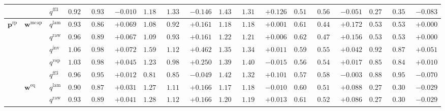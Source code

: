 \documentclass[eng]{kjas3}
\begin{document}
\begin{table}[t]
{\begin{tabular}{lll ccc ccc ccc ccc ccc}
 &  & $q^{\mathrm{ff3}}$ & $0.925$ & $0.935$ & \cellcolor{negred!50}$-0.010$ & $1.184$ & $1.330$ & \cellcolor{negred!50}$-0.146$ & $1.438$ & $1.312$ & \cellcolor{posgreen!50}$+0.126$ & $0.511$ & $0.562$ & \cellcolor{negred!50}$-0.051$ & $0.271$ & $0.354$ & \cellcolor{negred!50}$-0.083$ \\
\midrule
$\mathbf{p}^{\mathrm{rp}}$ & $\mathbf{w}^{\mathrm{mcap}}$ & $q^{\mathrm{lam}}$ & $0.935$ & $0.865$ & \cellcolor{posgreen!50}$+0.069$ & $1.088$ & $0.926$ & \cellcolor{posgreen!50}$+0.161$ & $1.186$ & $1.185$ & \cellcolor{posgreen!50}$+0.001$ & $0.619$ & $0.447$ & \cellcolor{posgreen!50}$+0.172$ & $0.534$ & $0.534$ & $+0.000$ \\
 &  & $q^{\mathrm{raw}}$ & $0.960$ & $0.893$ & \cellcolor{posgreen!50}$+0.067$ & $1.092$ & $0.931$ & \cellcolor{posgreen!50}$+0.161$ & $1.222$ & $1.216$ & \cellcolor{posgreen!50}$+0.006$ & $0.626$ & $0.471$ & \cellcolor{posgreen!50}$+0.156$ & $0.534$ & $0.534$ & $+0.000$ \\
 &  & $q^{\mathrm{inv}}$ & $1.061$ & $0.989$ & \cellcolor{posgreen!50}$+0.072$ & $1.590$ & $1.127$ & \cellcolor{posgreen!50}$+0.462$ & $1.353$ & $1.342$ & \cellcolor{posgreen!50}$+0.011$ & $0.593$ & $0.551$ & \cellcolor{posgreen!50}$+0.042$ & $0.929$ & $0.878$ & \cellcolor{posgreen!50}$+0.051$ \\
 &  & $q^{\mathrm{vsp}}$ & $1.030$ & $0.985$ & \cellcolor{posgreen!50}$+0.045$ & $1.233$ & $0.983$ & \cellcolor{posgreen!50}$+0.250$ & $1.394$ & $1.409$ & \cellcolor{negred!50}$-0.015$ & $0.560$ & $0.543$ & \cellcolor{posgreen!50}$+0.017$ & $0.851$ & $0.841$ & \cellcolor{posgreen!50}$+0.010$ \\
 &  & $q^{\mathrm{ff3}}$ & $0.969$ & $0.957$ & \cellcolor{posgreen!50}$+0.012$ & $0.810$ & $0.859$ & \cellcolor{negred!50}$-0.049$ & $1.421$ & $1.320$ & \cellcolor{posgreen!50}$+0.101$ & $0.577$ & $0.580$ & \cellcolor{negred!50}$-0.003$ & $0.883$ & $0.953$ & \cellcolor{negred!50}$-0.070$ \\
\cmidrule(lr){2-18}
 & $\mathbf{w}^{\mathrm{eq}}$ & $q^{\mathrm{lam}}$ & $0.906$ & $0.875$ & \cellcolor{posgreen!50}$+0.031$ & $1.277$ & $1.112$ & \cellcolor{posgreen!50}$+0.166$ & $1.171$ & $1.181$ & \cellcolor{negred!50}$-0.010$ & $0.603$ & $0.515$ & \cellcolor{posgreen!50}$+0.088$ & $0.274$ & $0.303$ & \cellcolor{negred!50}$-0.029$ \\
 &  & $q^{\mathrm{raw}}$ & $0.933$ & $0.892$ & \cellcolor{posgreen!50}$+0.041$ & $1.289$ & $1.123$ & \cellcolor{posgreen!50}$+0.166$ & $1.207$ & $1.194$ & \cellcolor{posgreen!50}$+0.013$ & $0.613$ & $0.527$ & \cellcolor{posgreen!50}$+0.086$ & $0.274$ & $0.303$ & \cellcolor{negred!50}$-0.029$ \\

\end{tabular}}
\end{table}
\end{document}
